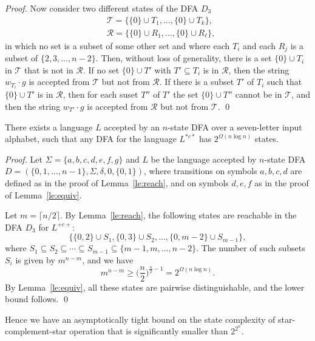 \documentclass[runningheads]{llncs}
\begin{document}
\begin{proof}
 Now consider  two different states of the DFA $D_3$
 \begin{align*}
    & \mathcal{T}=\big\{  \{0\} \cup T_1, \ldots, \{0\}\cup T_k \big\},\\
    & \mathcal{R}=\big\{  \{0\} \cup R_1, \ldots, \{0\}\cup R_\ell \big\}, 
 \end{align*}
 in which no set is a subset of some other set and where
 each $T_i$ and each $R_j$ is a subset of $\{2,3,\ldots,n-2\}$.
 Then, without loss of generality,
 there is a set $\{0\}\cup T_i$ in $\mathcal{T}$ that is not in $\mathcal{R}$.
 If no set $\{0\}\cup T'$ with $T'\subseteq T_i$ is in $\mathcal{R}$,
 then the string $w_{T_i}\cdot g$
 is accepted from $\mathcal{T}$ but not from $\mathcal{R}$.
 If there is a subset $T'$ of $T_i$
 such that $\{0\}\cup T'$ is  in $\mathcal{R}$,
    then for each suset $T''$ of $T'$
    the set $\{0\}\cup T''$  cannot be in $\mathcal{T}$,
    and then the string  $w_{T'}\cdot g$
 is accepted from $\mathcal{R}$ but not from $\mathcal{T}$.
\qed
\end{proof}

\begin{corollary}\label{-----co2}
 There exists a language $L$ 
 accepted by an $n$-state DFA  over a seven-letter input alphabet,
 such that any DFA for the language $L^{*c*}$ 
 has  $2^{\Omega(n\log n)}$ states.
\end{corollary}

\begin{proof}
 Let 
 $\Sigma=\{a,b,c,d,e,f,g\}$ and
 $L$ be the language 
 accepted by $n$-state DFA $D=(\{0,1,\ldots,n-1\},\Sigma,\delta,0,\{0,1\})$,
 where transitions on symbols $a,b,c,d$ 
 are defined as in the proof of Lemma~\ref{le:reach},
 and on symbols $d,e,f$ as in the proof of Lemma~\ref{le:equiv}.

 Let $m=\lceil n/2  \rceil$.
 By Lemma~\ref{le:reach},
 the following states
 are reachable in the DFA $D_3$    
 for $L^{+c+}$:
 $$
     \{ \{0,2\}\cup S_1, \{0,3\}\cup S_2,\ldots, 
                   \{0,m-2\}\cup S_{m-1}\},
 $$
 where 
 $S_1\subseteq S_2 \subseteq\cdots \subseteq S_{m-1}\subseteq\{m-1,m,\ldots,n-2\}$.
 The number of such subsets $S_i$ is given by $m^{n-m}$, and we have
 $$
  m^{n-m}\ge \Big( \frac{n}{2}\Big) ^{\frac{n}{2}-1}=2^{\Omega(n\log n)}.
 $$
 By Lemma~\ref{le:equiv}, all these states are pairwise distinguishable,
 and the lower bound follows. 
\qed
\end{proof}

Hence we have an asymptotically tight bound on the state complexity of
star-complement-star operation that is significantly smaller than
$2^{2^n}$.
\end{document}
